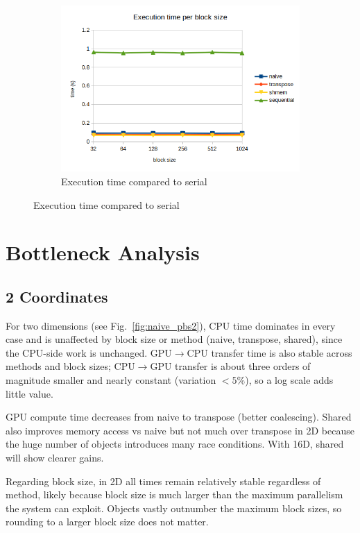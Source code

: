 \documentclass{article}
\newcommand{\eng}[1]{#1}
\begin{document}
\begin{figure}[h]
\begin{subfigure}{0.6\textwidth}
        \includegraphics[width=\textwidth]{../a4/plots/kmeans_execution_time_vs_serial.png}
        \caption{Execution time compared to \eng{serial}}
        \label{fig:timekm-ser}
    \end{subfigure}
\end{figure}
\FloatBarrier

\clearpage
\section{\eng{Bottleneck Analysis}}

\subsection{\eng{2 Coordinates}}

For two dimensions (see Fig.~\ref{fig:naive_pbs2}), CPU time dominates in every case and is unaffected by \eng{block size} or method (\eng{naive}, \eng{transpose}, \eng{shared}), since the CPU-side work is unchanged. GPU$\rightarrow$CPU transfer time is also stable across methods and block sizes; CPU$\rightarrow$GPU transfer is about three orders of magnitude smaller and nearly constant (variation $<5\%$), so a log scale adds little value.

GPU compute time decreases from \eng{naive} to \eng{transpose} (better coalescing). \eng{Shared} also improves memory access vs \eng{naive} but not much over \eng{transpose} in 2D because the huge number of objects introduces many race conditions. With 16D, \eng{shared} will show clearer gains.

Regarding \eng{block size}, in 2D all times remain relatively stable regardless of method, likely because \eng{block size} is much larger than the maximum parallelism the system can exploit. Objects vastly outnumber the maximum block sizes, so rounding to a larger block size does not matter.
\end{document}

